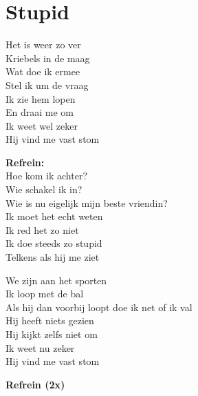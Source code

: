 \section{Stupid}
Het is weer zo ver\\
Kriebels in de maag\\
Wat doe ik ermee\\
Stel ik um de vraag\\
Ik zie hem lopen\\
En draai me om \\
Ik weet wel zeker\\
Hij vind me vast stom

\textbf{Refrein:}\\
Hoe kom ik achter?\\
Wie schakel ik in?\\
Wie is nu eigelijk mijn beste vriendin?\\ 
Ik moet het echt weten \\
Ik red het zo niet\\
Ik doe steeds zo stupid\\
Telkens als hij me ziet

We zijn aan het sporten\\
Ik loop met de bal\\
Als hij dan voorbij loopt doe ik net of ik val\\
Hij heeft niets gezien\\
Hij kijkt zelfs niet om \\
Ik weet nu zeker\\
Hij vind me vast stom

\textbf{Refrein (2x)}
